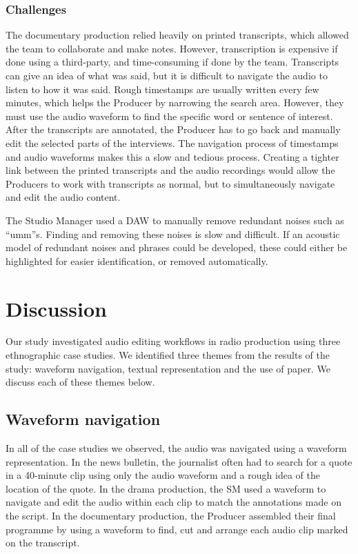 \subsubsection{Challenges}
The documentary production relied heavily on printed transcripts, which allowed the team to collaborate and make notes.
However, transcription is expensive if done using a third-party, and time-consuming if done by the team.  Transcripts
can give an idea of what was said, but it is difficult to navigate the audio to listen to how it was said. Rough
timestamps are usually written every few minutes, which helps the Producer by narrowing the search area. However, they
must use the audio waveform to find the specific word or sentence of interest. After the transcripts are annotated,
the Producer has to go back and manually edit the selected parts of the interviews. The navigation process of
timestamps and audio waveforms makes this a slow and tedious process.  Creating a tighter link between the printed
transcripts and the audio recordings would allow the Producers to work with transcripts as normal, but to
simultaneously navigate and edit the audio content.

The Studio Manager used a DAW to manually remove redundant noises such as ``umm''s.  Finding and removing these noises
is slow and difficult. If an acoustic model of redundant noises and phrases could be developed, these could either be
highlighted for easier identification, or removed automatically.

\section{Discussion}\label{sec:ethno-discussion}
Our study investigated audio editing workflows in radio production using three ethnographic case studies. We identified
three themes from the results of the study: waveform navigation, textual representation and the use of paper. We
discuss each of these themes below.

\subsection{Waveform navigation}
In all of the case studies we observed, the audio was navigated using a waveform representation.  In the news bulletin,
the journalist often had to search for a quote in a 40-minute clip using only the audio waveform and a rough idea of
the location of the quote.  In the drama production, the SM used a waveform to navigate and edit the audio within each
clip to match the annotations made on the script.  In the documentary production, the Producer assembled their final
programme by using a waveform to find, cut and arrange each audio clip marked on the transcript.

